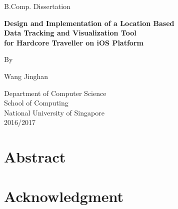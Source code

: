 \documentclass[12pt,a4paper]{article}
\begin{document}
	\begin{titlepage}
		\begin{center}
		
			B.Comp. Dissertation
			
			\vspace*{3.5cm}
			
			\fontsize{14pt}{14pt}\textbf {
			    Design and Implementation of a Location Based\\
                Data Tracking and Visualization Tool\\
                for Hardcore Traveller on iOS Platform\\
			}
			
			\vspace{4.5cm}
			
			By
			
			\vspace{0.5cm}
			
			Wang Jinghan
			
			
			\vfill
			
			
			
			Department of Computer Science\\
			School of Computing\\
			National University of Singapore\\
			2016/2017
			
		\end{center}
	\end{titlepage}
	
	
    \section*{Abstract}
    \clearpage
    
    
    \section*{Acknowledgment}
    \clearpage
    
    
    \renewcommand{\listfigurename}{List of Figures}
    \listoffigures
    \clearpage
	
	
	\tableofcontents


	\newpage
\end{document}
